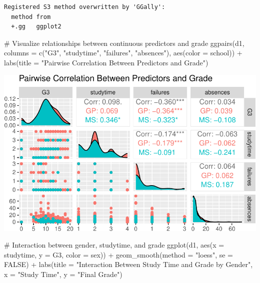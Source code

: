 \documentclass[
  10pt,
]{article}
\newenvironment{Shaded}{\begin{snugshade}}{\end{snugshade}}
\newcommand{\AttributeTok}[1]{\textcolor[rgb]{0.40,0.45,0.13}{#1}}
\newcommand{\CommentTok}[1]{\textcolor[rgb]{0.37,0.37,0.37}{#1}}
\newcommand{\ConstantTok}[1]{\textcolor[rgb]{0.56,0.35,0.01}{#1}}
\newcommand{\FunctionTok}[1]{\textcolor[rgb]{0.28,0.35,0.67}{#1}}
\newcommand{\NormalTok}[1]{\textcolor[rgb]{0.00,0.23,0.31}{#1}}
\newcommand{\SpecialCharTok}[1]{\textcolor[rgb]{0.37,0.37,0.37}{#1}}
\newcommand{\StringTok}[1]{\textcolor[rgb]{0.13,0.47,0.30}{#1}}
\begin{document}
\begin{verbatim}
Registered S3 method overwritten by 'GGally':
  method from   
  +.gg   ggplot2
\end{verbatim}

\begin{Shaded}
\begin{Highlighting}[]
\CommentTok{\# Visualize relationships between continuous predictors and grade}
\FunctionTok{ggpairs}\NormalTok{(d1, }\AttributeTok{columns =} \FunctionTok{c}\NormalTok{(}\StringTok{"G3"}\NormalTok{, }\StringTok{"studytime"}\NormalTok{, }\StringTok{"failures"}\NormalTok{, }\StringTok{"absences"}\NormalTok{), }
        \FunctionTok{aes}\NormalTok{(}\AttributeTok{color =}\NormalTok{ school)) }\SpecialCharTok{+}
  \FunctionTok{labs}\NormalTok{(}\AttributeTok{title =} \StringTok{"Pairwise Correlation Between Predictors and Grade"}\NormalTok{)}
\end{Highlighting}
\end{Shaded}

\includegraphics{551-HW-Q3_files/figure-pdf/unnamed-chunk-1-1.pdf}

\begin{Shaded}
\begin{Highlighting}[]
\CommentTok{\# Interaction between gender, studytime, and grade}
\FunctionTok{ggplot}\NormalTok{(d1, }\FunctionTok{aes}\NormalTok{(}\AttributeTok{x =}\NormalTok{ studytime, }\AttributeTok{y =}\NormalTok{ G3, }\AttributeTok{color =}\NormalTok{ sex)) }\SpecialCharTok{+}
  \FunctionTok{geom\_smooth}\NormalTok{(}\AttributeTok{method =} \StringTok{"loess"}\NormalTok{, }\AttributeTok{se =} \ConstantTok{FALSE}\NormalTok{) }\SpecialCharTok{+}
  \FunctionTok{labs}\NormalTok{(}\AttributeTok{title =} \StringTok{"Interaction Between Study Time and Grade by Gender"}\NormalTok{, }
       \AttributeTok{x =} \StringTok{"Study Time"}\NormalTok{, }\AttributeTok{y =} \StringTok{"Final Grade"}\NormalTok{)}
\end{Highlighting}
\end{Shaded}
\end{document}
